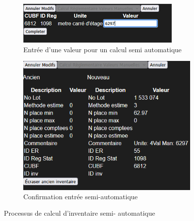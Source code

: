 \begin{figure}[h]
    \centering
    \begin{subfigure}[c]{0.4\textwidth}
        \includegraphics[width=1\linewidth,center]{images/ModifEntreeSemiAutomatique.png}
        \caption{Entrée d'une valeur pour un calcul semi automatique}
        \label{fig:modif-inventaire-semi}
    \end{subfigure}
    \begin{subfigure}[c]{0.4\textwidth}
        \includegraphics[width=1\linewidth,center]{images/ResultatModifSemiAutomatique.png}
        \caption{Confirmation entrée semi-automatique}
        \label{fig:conf-inv-semi}
    \end{subfigure}
    \caption{Processus de calcul d'inventaire semi- automatique}
    \label{fig:modif-inventaire-semi-nonsub}
\end{figure}
